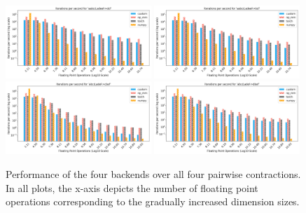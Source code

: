 \begin{figure}[h]
    \label{pic:all}
    \centering
    \includegraphics[width=0.49\textwidth]{images/aabcd_adeef__dcf.png} 
    \includegraphics[width=0.49\textwidth]{images/aabcd_adeef__bcf.png} \\
    \includegraphics[width=0.49\textwidth]{images/abcd_adef__cbef.png}
    \includegraphics[width=0.49\textwidth]{images/abcd_adef__dbef.png}
    \caption{Performance of the four backends over all four pairwise contractions. In all plots, the x-axis depicts the number of floating point operations corresponding to the gradually increased dimension sizes. }
\end{figure}


